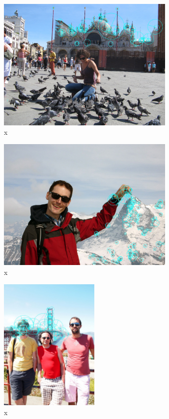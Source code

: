 \documentclass[runningheads]{llncs}
\begin{document}
\begin{figure} \centering \includegraphics[height=6.5cm]{images/samei.jpg}
\caption{x} \label{fig:example} \end{figure}

\begin{figure} \centering \includegraphics[height=6.5cm]{images/schneider.jpg}
\caption{x} \label{fig:example} \end{figure}

\begin{figure} \centering \includegraphics[height=6.5cm]{images/SF.jpg}
\caption{x} \label{fig:example} \end{figure}
\end{document}
